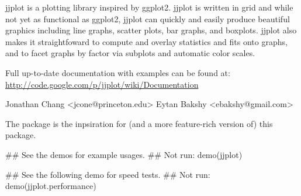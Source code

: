 \begin{Description}\relax
jjplot is a plotting library inspired by ggplot2.  jjplot is written in
grid and while not yet as functional as ggplot2, jjplot can quickly and
easily produce beautiful graphics including line graphs, scatter plots,
bar graphs, and boxplots.  jjplot also makes it straightfoward to
compute and overlay statistics and fits onto graphs, and to facet graphs
by factor via subplots and automatic color scales.
\end{Description}
\begin{Details}\relax
{}

Full up-to-date documentation with examples can be found at:
\url{http://code.google.com/p/jjplot/wiki/Documentation}
\end{Details}
\begin{Author}\relax
Jonathan Chang \textless{}jcone@princeton.edu\textgreater{}
Eytan Bakshy \textless{}ebakshy@gmail.com\textgreater{}
\end{Author}
\begin{References}\relax
The  package is the inpsiration for (and a more
feature-rich version of) this package.
\end{References}
\begin{SeeAlso}\relax
{}
\end{SeeAlso}
\begin{Examples}
\begin{ExampleCode}
 ## See the demos for example usages.
 ## Not run: demo(jjplot)

 ## See the following demo for speed tests.
 ## Not run: demo(jjplot.performance)
\end{ExampleCode}
\end{Examples}

